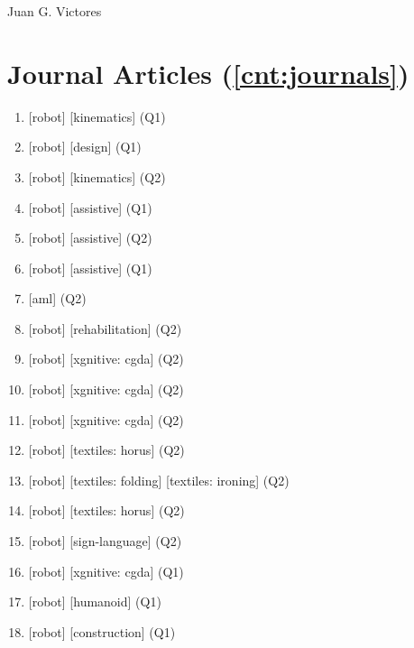 \documentclass{article}
\def\name{Juan G. Victores}
\begin{document}
{\huge \name}

\vspace{0.2in}



\section*{Journal Articles (\ref*{cnt:journals})}
\begin{enumerate}
  \item {} [robot] [kinematics] (Q1)
  \item {} [robot] [design] (Q1)
  \item {} [robot] [kinematics] (Q2)
  \item {} [robot] [assistive] (Q1)
  \item {} [robot] [assistive] (Q2)
  \item {} [robot] [assistive] (Q1)
  \item {} [aml] (Q2)
  \item {} [robot] [rehabilitation] (Q2)
  \item {} [robot] [xgnitive: cgda] (Q2)
  \item {} [robot] [xgnitive: cgda] (Q2)
  \item {} [robot] [xgnitive: cgda] (Q2)
  \item {} [robot] [textiles: horus] (Q2)
  \item {} [robot] [textiles: folding] [textiles: ironing] (Q2)
  \item {} [robot] [textiles: horus] (Q2)
  \item {} [robot] [sign-language] (Q2)
  \item {} [robot] [xgnitive: cgda] (Q1)
  \item {} [robot] [humanoid] (Q1)
  \item {} [robot] [construction] (Q1)

\end{enumerate}
\end{document}
